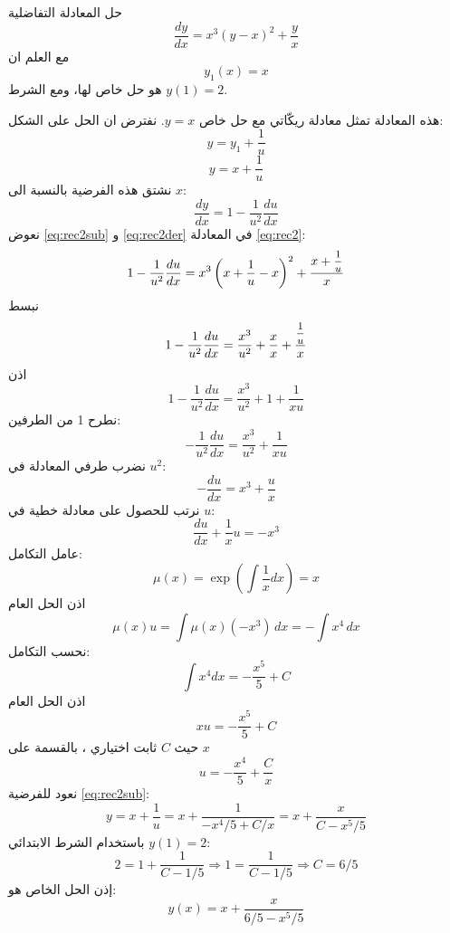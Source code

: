 \setcounter{equation}{0}
\begin{example}
	حل المعادلة التفاضلية
	\begin{equation}
		\label{eq:rec2}
		\frac{dy}{dx} = x^3 (y - x)^2 + \frac{y}{x}
	\end{equation}
	مع العلم ان 
	\[
	y_1(x) = x
	\] 
	هو حل خاص لها، ومع الشرط $y(1) = 2$.
\end{example}

\begin{solution}
	هذه المعادلة تمثل معادلة ريكّاتي مع حل خاص \(y = x\). نفترض ان الحل على الشكل:
	\[
	y = y_1 + \frac{1}{u}
	\]
	\begin{equation}
		\label{eq:rec2sub}
		y = x + \frac{1}{u}
	\end{equation}
	نشتق هذه الفرضية بالنسبة الى $x$:
	\begin{equation}
		\label{eq:rec2der}
		\frac{dy}{dx} = 1 - \frac{1}{u^2}\frac{du}{dx}
	\end{equation}
	نعوض \eqref{eq:rec2sub} و \eqref{eq:rec2der} في المعادلة \eqref{eq:rec2}:
	\[
	1 - \frac{1}{u^2}\frac{du}{dx} = x^3 \left(x + \frac{1}{u} - x\right)^2 + \frac{x + \mfrac{1}{u}}{x}
	\]
	نبسط
	\[
	1 - \frac{1}{u^2}\frac{du}{dx} = \frac{x^3}{u^2} + \frac{x}{x} + \frac{\mfrac{1}{u}}{x}
	\]
	اذن 
	\[
	1 - \frac{1}{u^2} \frac{du}{dx} = \frac{x^3}{u^2} + 1 + \frac{1}{xu}
	\]
	نطرح 1 من الطرفين:
	\[
	- \frac{1}{u^2}\frac{du}{dx} = \frac{x^3}{u^2} + \frac{1}{xu}
	\]
	نضرب طرفي المعادلة في $u^2$:
	\[
	- \frac{du}{dx} = x^3 + \frac{u}{x}
	\]
	نرتب للحصول على معادلة خطية في $u$:
	\begin{equation}
		\label{eq:rec2linear}
		\frac{du}{dx} + \frac{1}{x} u = - x^3
	\end{equation}
	عامل التكامل:
	\[
	\mu(x) = \exp\left(\int \frac{1}{x} dx\right) = x
	\]
	اذن الحل العام 
	\[
	\mu(x) u = \int \mu(x) (-x^3) \, dx = - \int x^4 \, dx
	\]
	نحسب التكامل:
	\[
	\int x^4 dx = - \frac{x^5}{5} + C
	\]
	اذن الحل العام
	\[
	xu = - \frac{x^5}{5} + C
	\]
	حيث $C$ ثابت اختياري ، بالقسمة على $x$
	\[
	u = - \frac{x^4}{5} + \frac{C}{x}
	\]
	نعود للفرضية \eqref{eq:rec2sub}:
	\[
	y = x + \frac{1}{u} = x + \frac{1}{- x^4 /5 + C/x} = x + \frac{x}{C - x^5/5}
	\]
	باستخدام الشرط الابتدائي $y(1) = 2$:
	\[
	2 = 1 + \frac{1}{C - 1/5} \Rightarrow 1 = \frac{1}{C - 1/5} \Rightarrow C = 6/5
	\]
	إذن الحل الخاص هو:
	\[
	\boxed{y(x) = x + \frac{x}{6/5 - x^5/5}}
	\]
\end{solution}
\newpage
